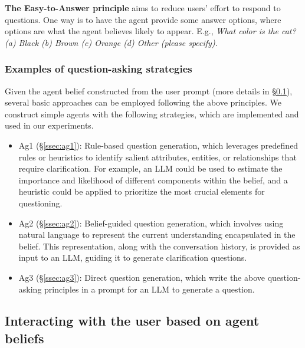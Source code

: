 \textbf{The Easy-to-Answer principle} aims to reduce users' effort to respond to questions. One way is to have the agent provide some answer options, where options are what the agent believes likely to appear. E.g., \textit{What color is the cat? (a) Black (b) Brown (c) Orange (d) Other (please specify)}.



\vspace{-.5em}
\subsubsection{Examples of question-asking strategies}
\label{sssec:question-asking-agents}
\vspace{-.5em}
Given the agent belief constructed from the user prompt (more details in \S \ref{ssec:structure_bs}), several basic approaches can be employed following the above principles. We construct simple agents with the following strategies, which are implemented and used in our experiments. 
\begin{itemize}[wide, labelwidth=0pt, labelindent=10pt]
\item Ag1 (\S\ref{ssec:ag1}): Rule-based question generation, which leverages predefined rules or heuristics to identify salient attributes, entities, or relationships that require clarification. For example, an LLM could be used to estimate the importance and likelihood of different components within the belief, and a heuristic could be applied to prioritize the most crucial elements for questioning.
\item Ag2 (\S\ref{ssec:ag2}): Belief-guided question generation, which involves using natural language to represent the current understanding encapsulated in the belief. This representation, along with the conversation history, is provided as input to an LLM, guiding it to generate clarification questions.
\item Ag3 (\S\ref{ssec:ag3}): Direct question generation, which write the above question-asking principles in a prompt for an LLM to generate a question. %
\end{itemize}


\vspace{-.5em}
\subsection{Interacting with the user based on agent beliefs} \label{ssec:structure_bs}
\vspace{-.5em}

